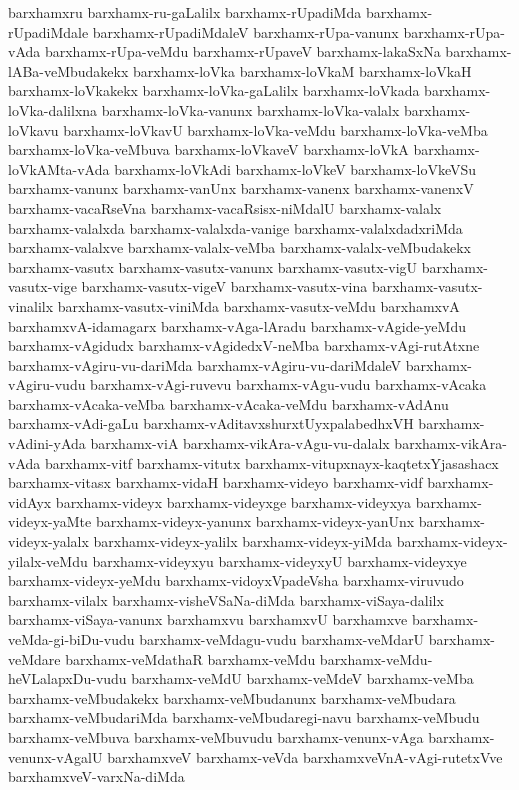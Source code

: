{barxhamxru
barxhamx-ru-gaLalilx
barxhamx-rUpadiMda
barxhamx-rUpadiMdale
barxhamx-rUpadiMdaleV
barxhamx-rUpa-vanunx
barxhamx-rUpa-vAda
barxhamx-rUpa-veMdu
barxhamx-rUpaveV
barxhamx-lakaSxNa
barxhamx-lABa-veMbudakekx
barxhamx-loVka
barxhamx-loVkaM
barxhamx-loVkaH
barxhamx-loVkakekx
barxhamx-loVka-gaLalilx
barxhamx-loVkada
barxhamx-loVka-dalilxna
barxhamx-loVka-vanunx
barxhamx-loVka-valalx
barxhamx-loVkavu
barxhamx-loVkavU
barxhamx-loVka-veMdu
barxhamx-loVka-veMba
barxhamx-loVka-veMbuva
barxhamx-loVkaveV
barxhamx-loVkA
barxhamx-loVkAMta-vAda
barxhamx-loVkAdi
barxhamx-loVkeV
barxhamx-loVkeVSu
barxhamx-vanunx
barxhamx-vanUnx
barxhamx-vanenx
barxhamx-vanenxV
barxhamx-vacaRseVna
barxhamx-vacaRsisx-niMdalU
barxhamx-valalx
barxhamx-valalxda
barxhamx-valalxda-vanige
barxhamx-valalxdadxriMda
barxhamx-valalxve
barxhamx-valalx-veMba
barxhamx-valalx-veMbudakekx
barxhamx-vasutx
barxhamx-vasutx-vanunx
barxhamx-vasutx-vigU
barxhamx-vasutx-vige
barxhamx-vasutx-vigeV
barxhamx-vasutx-vina
barxhamx-vasutx-vinalilx
barxhamx-vasutx-viniMda
barxhamx-vasutx-veMdu
barxhamxvA
barxhamxvA-idamagarx
barxhamx-vAga-lAradu
barxhamx-vAgide-yeMdu
barxhamx-vAgidudx
barxhamx-vAgidedxV-neMba
barxhamx-vAgi-rutAtxne
barxhamx-vAgiru-vu-dariMda
barxhamx-vAgiru-vu-dariMdaleV
barxhamx-vAgiru-vudu
barxhamx-vAgi-ruvevu
barxhamx-vAgu-vudu
barxhamx-vAcaka
barxhamx-vAcaka-veMba
barxhamx-vAcaka-veMdu
barxhamx-vAdAnu
barxhamx-vAdi-gaLu
barxhamx-vAditavxshurxtUyxpalabedhxVH
barxhamx-vAdini-yAda
barxhamx-viA
barxhamx-vikAra-vAgu-vu-dalalx
barxhamx-vikAra-vAda
barxhamx-vitf
barxhamx-vitutx
barxhamx-vitupxnayx-kaqtetxYjasashacx
barxhamx-vitasx
barxhamx-vidaH
barxhamx-videyo
barxhamx-vidf
barxhamx-vidAyx
barxhamx-videyx
barxhamx-videyxge
barxhamx-videyxya
barxhamx-videyx-yaMte
barxhamx-videyx-yanunx
barxhamx-videyx-yanUnx
barxhamx-videyx-yalalx
barxhamx-videyx-yalilx
barxhamx-videyx-yiMda
barxhamx-videyx-yilalx-veMdu
barxhamx-videyxyu
barxhamx-videyxyU
barxhamx-videyxye
barxhamx-videyx-yeMdu
barxhamx-vidoyxVpadeVsha
barxhamx-viruvudo
barxhamx-vilalx
barxhamx-visheVSaNa-diMda
barxhamx-viSaya-dalilx
barxhamx-viSaya-vanunx
barxhamxvu
barxhamxvU
barxhamxve
barxhamx-veMda-gi-biDu-vudu
barxhamx-veMdagu-vudu
barxhamx-veMdarU
barxhamx-veMdare
barxhamx-veMdathaR
barxhamx-veMdu
barxhamx-veMdu-heVLalapxDu-vudu
barxhamx-veMdU
barxhamx-veMdeV
barxhamx-veMba
barxhamx-veMbudakekx
barxhamx-veMbudanunx
barxhamx-veMbudara
barxhamx-veMbudariMda
barxhamx-veMbudaregi-navu
barxhamx-veMbudu
barxhamx-veMbuva
barxhamx-veMbuvudu
barxhamx-venunx-vAga
barxhamx-venunx-vAgalU
barxhamxveV
barxhamx-veVda
barxhamxveVnA-vAgi-rutetxVve
barxhamxveV-varxNa-diMda
}
